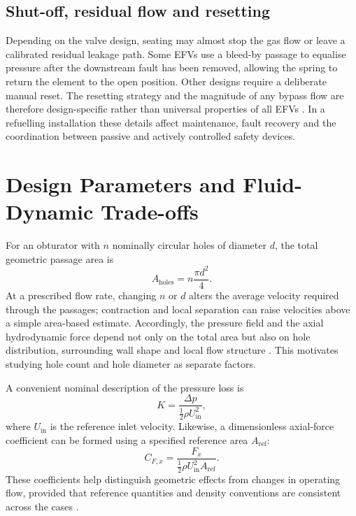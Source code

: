 \subsection{Shut-off, residual flow and resetting}

Depending on the valve design, seating may almost stop the gas flow or leave a calibrated residual leakage path. Some EFVs use a bleed-by passage to equalise pressure after the downstream fault has been removed, allowing the spring to return the element to the open position. Other designs require a deliberate manual reset. The resetting strategy and the magnitude of any bypass flow are therefore design-specific rather than universal properties of all EFVs \cite{honeywell_efv,linde_efv,teco_efv}. In a refuelling installation these details affect maintenance, fault recovery and the coordination between passive and actively controlled safety devices.

\section{Design Parameters and Fluid-Dynamic Trade-offs}
\label{sec:efv_design_parameters}

For an obturator with $n$ nominally circular holes of diameter $d$, the total geometric passage area is
\begin{equation}
A_{\mathrm{holes}}=n\frac{\pi d^2}{4}.
\label{eq:efv_open_area}
\end{equation}
At a prescribed flow rate, changing $n$ or $d$ alters the average velocity required through the passages; contraction and local separation can raise velocities above a simple area-based estimate. Accordingly, the pressure field and the axial hydrodynamic force depend not only on the total area but also on hole distribution, surrounding wall shape and local flow structure \cite{crane410,white2016}. This motivates studying hole count and hole diameter as separate factors.

A convenient nominal description of the pressure loss is
\begin{equation}
K=\frac{\Delta p}{\tfrac{1}{2}\rho U_{\mathrm{in}}^2},
\label{eq:efv_loss_coefficient}
\end{equation}
where $U_{\mathrm{in}}$ is the reference inlet velocity. Likewise, a dimensionless axial-force coefficient can be formed using a specified reference area $A_{\mathrm{ref}}$:
\begin{equation}
C_{F,x}=\frac{F_x}{\tfrac{1}{2}\rho U_{\mathrm{in}}^2 A_{\mathrm{ref}}}.
\label{eq:efv_force_coefficient}
\end{equation}
These coefficients help distinguish geometric effects from changes in operating flow, provided that reference quantities and density conventions are consistent across the cases \cite{white2016}.

